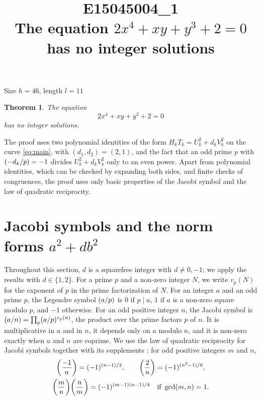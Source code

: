 \documentclass[11pt]{article}
\title{\textbf{E15045004\_1}\\[4pt] {\Large The equation $2x^{4}+xy+y^{3}+2=0$ has no integer solutions}}
\author{}
\date{}
\newtheorem{theorem}{Theorem}
\newcommand{\leg}[2]{\mathchoice{\biggl(\dfrac{#1}{#2}\biggr)}{(#1/#2)}{(#1/#2)}{(#1/#2)}}
\begin{document}
\maketitle
\vspace{-8ex}
\begin{center}
Size $h=46$, length $l=11$
\end{center}

\begin{theorem}\label{thm:main}
The equation
\begin{equation}\label{eq:main}
2x^{4}+xy+y^{3}+2=0
\end{equation}
has no integer solutions.
\end{theorem}

The proof uses two polynomial identities of the form $H_kT_k=U_k^2+d_kV_k^2$ on the curve \eqref{eq:main}, with $(d_1,d_2)=(2,1)$, and the fact that an odd prime $p$ with $\leg{-d_k}{p}=-1$ divides $U_k^2+d_kV_k^2$ only to an even power. Apart from polynomial identities, which can be checked by expanding both sides, and finite checks of congruences, the proof uses only basic properties of the Jacobi symbol and the law of quadratic reciprocity.

\section{Jacobi symbols and the norm forms $a^2+db^2$}

Throughout this section, $d$ is a squarefree integer with $d\neq0,-1$; we apply the results with $d\in\{1,2\}$. For a prime $p$ and a non-zero integer $N$, we write $v_p(N)$ for the exponent of $p$ in the prime factorization of $N$. For an integer $a$ and an odd prime $p$, the Legendre symbol $\leg{a}{p}$ is $0$ if $p\mid a$, $1$ if $a$ is a non-zero square modulo $p$, and $-1$ otherwise. For an odd positive integer $n$, the Jacobi symbol is $\leg{a}{n}=\prod_p\leg{a}{p}^{v_p(n)}$, the product over the prime factors $p$ of $n$. It is multiplicative in $a$ and in $n$, it depends only on $a$ modulo $n$, and it is non-zero exactly when $a$ and $n$ are coprime. We use the law of quadratic reciprocity for Jacobi symbols together with its supplements \cite[Chapter~5, \S2]{IR}: for odd positive integers $m$ and $n$,
\begin{gather*}
\leg{-1}{n}=(-1)^{(n-1)/2},\qquad\leg{2}{n}=(-1)^{(n^2-1)/8},\\
\leg{m}{n}\leg{n}{m}=(-1)^{(m-1)(n-1)/4}\quad\text{if }\gcd(m,n)=1.
\end{gather*}
\end{document}
